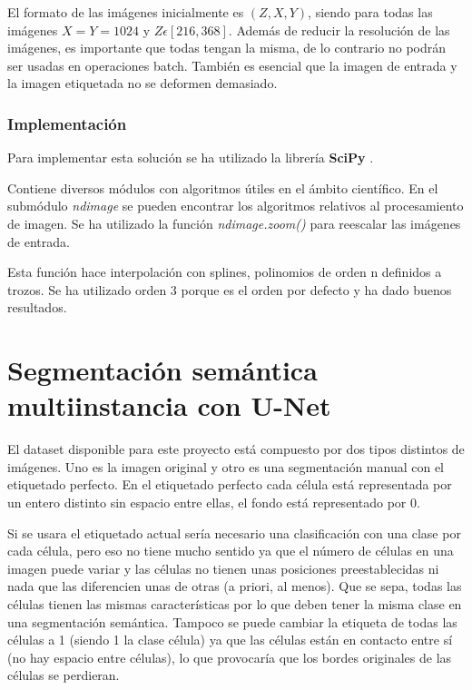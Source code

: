 El formato de las imágenes inicialmente es $ (Z,X,Y) $, siendo para todas las imágenes $ X = Y = 1024 $ y $ Z\epsilon[216,368] $. Además de reducir la resolución de las imágenes, es importante que todas tengan la misma, de lo contrario no podrán ser usadas en operaciones batch. También es esencial que la imagen de entrada y la imagen etiquetada no se deformen demasiado.

\subsubsection{Implementación}\label{subsec:size_problem_implementation}

Para implementar esta solución se ha utilizado la librería \textbf{SciPy} \cite{Virtanen2020}. 

Contiene diversos módulos con algoritmos útiles en el ámbito científico. En el submódulo \textit{ndimage} se pueden encontrar los algoritmos relativos al procesamiento de imagen. Se ha utilizado la función \textit{ndimage.zoom()} para reescalar las imágenes de entrada.

Esta función hace interpolación con splines, polinomios de orden n definidos a trozos. Se ha utilizado orden 3 porque es el orden por defecto y ha dado buenos resultados.

\section{Segmentación semántica multiinstancia con U-Net}\label{sec:multiinstance_segm}

El dataset disponible para este proyecto está compuesto por dos tipos distintos de imágenes. Uno es la imagen original y otro es una segmentación manual con el etiquetado perfecto. En el etiquetado perfecto cada célula está representada por un entero distinto sin espacio entre ellas, el fondo está representado por 0.

Si se usara el etiquetado actual sería necesario una clasificación con una clase por cada célula, pero eso no tiene mucho sentido ya que el número de células en una imagen puede variar y las células no tienen unas posiciones preestablecidas ni nada que las diferencien unas de otras (a priori, al menos). Que se sepa, todas las células tienen las mismas características por lo que deben tener la misma clase en una segmentación semántica. Tampoco se puede cambiar la etiqueta de todas las células a 1 (siendo 1 la clase célula) ya que las células están en contacto entre sí (no hay espacio entre células), lo que provocaría que los bordes originales de las células se perdieran.

